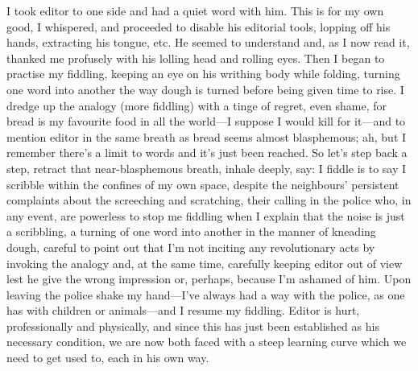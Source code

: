 \documentclass[
]{memoir}
\begin{document}
I took editor to one side and had a quiet word with him. This is for my
own good, I whispered, and proceeded to disable his editorial tools,
lopping off his hands, extracting his tongue, etc. He seemed to
understand and, as I now read it, thanked me profusely with his lolling
head and rolling eyes. Then I began to practise my fiddling, keeping an
eye on his writhing body while folding, turning one word into another
the way dough is turned before being given time to rise. I dredge up the
analogy (more fiddling) with a tinge of regret, even shame, for bread is
my favourite food in all the world---I suppose I would kill for it---and
to mention editor in the same breath as bread seems almost blasphemous;
ah, but I remember there's a limit to words and it's just been reached.
So let's step back a step, retract that near-blasphemous breath, inhale
deeply, say: I fiddle is to say I scribble within the confines of my own
space, despite the neighbours' persistent complaints about the
screeching and scratching, their calling in the police who, in any
event, are powerless to stop me fiddling when I explain that the noise
is just a scribbling, a turning of one word into another in the manner
of kneading dough, careful to point out that I'm not inciting any
revolutionary acts by invoking the analogy and, at the same time,
carefully keeping editor out of view lest he give the wrong impression
or, perhaps, because I'm ashamed of him. Upon leaving the police shake
my hand---I've always had a way with the police, as one has with
children or animals---and I resume my fiddling. Editor is hurt,
professionally and physically, and since this has just been established
as his necessary condition, we are now both faced with a steep learning
curve which we need to get used to, each in his own way.
\end{document}
